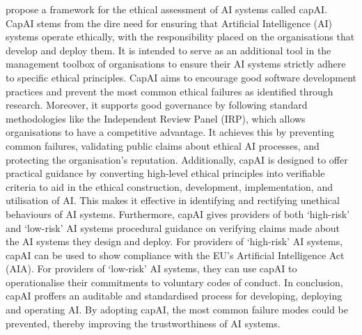 \cite{floridi_2022} propose a framework for the ethical assessment of AI systems called capAI. 
CapAI stems from the dire need for ensuring that Artificial Intelligence (AI) systems operate ethically, with the responsibility placed on the organisations that develop and deploy them. It is intended to serve as an additional tool in the management toolbox of organisations to ensure their AI systems strictly adhere to specific ethical principles.
CapAI aims to encourage good software development practices and prevent the most common ethical failures as identified through research. 
Moreover, it supports good governance by following standard methodologies like the Independent Review Panel (IRP), which allows organisations to have a competitive advantage. 
It achieves this by preventing common failures, validating public claims about ethical AI processes, and protecting the organisation’s reputation.
Additionally, capAI is designed to offer practical guidance by converting high-level ethical principles into verifiable criteria to aid in the ethical construction, development, implementation, and utilisation of AI. 
This makes it effective in identifying and rectifying unethical behaviours of AI systems.
Furthermore, capAI gives providers of both ‘high-risk’ and ‘low-risk’ AI systems procedural guidance on verifying claims made about the AI systems they design and deploy. For providers of ‘high-risk’ AI systems, capAI can be used to show compliance with the EU’s Artificial Intelligence Act (AIA). 
For providers of ‘low-risk’ AI systems, they can use capAI to operationalise their commitments to voluntary codes of conduct.
In conclusion, capAI proffers an auditable and standardised process for developing, deploying and operating AI. 
By adopting capAI, the most common failure modes could be prevented, thereby improving the trustworthiness of AI systems.